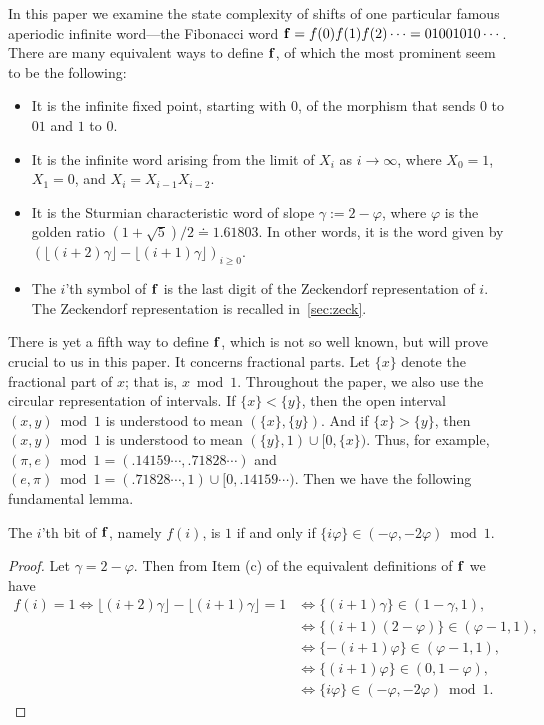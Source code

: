 \documentclass[12pt,runningheads]{llncs}
\renewcommand{\phi}{\varphi}
\begin{document}
In this paper we examine the state complexity of shifts of one particular famous aperiodic infinite word---the Fibonacci word ${\bf f} = f(0) f(1) f(2) \cdots = 01001010\cdots$. There are many equivalent ways to define $\bf f$, of which the most prominent seem to be the following: 
\begin{itemize} \setlength{\itemsep}{0em}
    \item[(a)]
It is the infinite fixed point, starting with $0$, of the morphism that sends $0$ to $01$ and
$1$ to $0$. 

\item[(b)] It is the infinite word arising from the limit of
$X_i$ as $i \rightarrow \infty$, where  $X_0 = 1$, $X_1 = 0$, and $X_i = X_{i-1} X_{i-2}$.

\item[(c)]  It is the Sturmian characteristic word of slope
$\gamma := 2-\phi$, where $\phi$ is the golden ratio $ (1+\sqrt{5})/2 \doteq 1.61803$. In other words, it is the word given by
$(\lfloor (i+2)\gamma \rfloor - \lfloor (i+1)\gamma \rfloor)_{i \geq 0}$.

\item[(d)] The $i$'th symbol of $\bf f$ is the last digit of the Zeckendorf representation of $i$. The Zeckendorf representation is recalled in~\cref{sec:zeck}.
\end{itemize}

There is yet a fifth way to define $\bf f$, which is not so well known, but will prove crucial to us in this paper.  It concerns fractional parts. Let $\{x\}$ denote the fractional part of $x$; that is, $x \bmod 1$.  Throughout the paper, we also use the  circular representation of intervals. If $\{x\} < \{y\}$, then the open interval $(x,y) \bmod 1$ is understood to mean $(\{ x \}, \{y\})$. And if $\{x\} > \{y\}$, then $(x,y) \bmod 1$ is understood to mean $ (\{ y \}, 1) \cup [0, \{x\} )$. Thus, for example, $(\pi,e) \bmod 1= (.14159\cdots, .71828\cdots)$ and $(e,\pi) \bmod 1 = (.71828\cdots, 1) \cup [0,.14159\cdots)$. Then we have the following fundamental lemma. 


\begin{lemma} \label{lem:01-areas}
The $i$'th bit of ${\bf f}$, namely $f(i)$, is
$1$ if and only if 
$\{ i \phi  \} \in (-\phi, -2\phi) \bmod 1$.
\end{lemma} 

\begin{proof}
Let $\gamma = 2-\phi$.  Then from Item (c) of the equivalent definitions of ${\bf f}$ we have
\begin{align*}
f(i) = 1 \iff  \lfloor (i+2) \gamma \rfloor - \lfloor (i+1) \gamma \rfloor = 1 & \iff \{(i+1) \gamma \} \in (1-\gamma, 1), \\
& \iff  \{ (i+1) (2-\phi)\} \in (\phi - 1, 1), \\
& \iff \{ -(i+1) \phi \} \in (\phi-1 ,1), \\
& \iff  \{ (i+1)\phi \} \in (0, 1-\phi), \\
& \iff  \{ i \phi \} \in (-\phi, -2\phi) \bmod 1.
\end{align*}
\end{proof}
\end{document}
